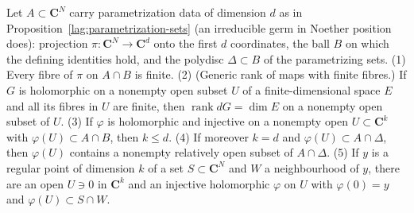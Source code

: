\begin{lemma}
\label{rem:finite-fibre-piece}
\leanok
Let \(A\subset\mathbf C^N\) carry parametrization data of dimension \(d\) as in Proposition~\ref{lag:parametrization-sets} (an irreducible germ in Noether position
does): projection \(\pi\colon\mathbf C^N\to\mathbf C^d\) onto the first \(d\) coordinates, the ball \(B\) on which the defining identities hold, and the polydisc
\(\Delta\subset B\) of the parametrizing sets.
(1) Every fibre of \(\pi\) on \(A\cap B\) is finite.
(2) (Generic rank of maps with finite fibres.) If \(G\) is holomorphic on a nonempty open subset \(U\) of a finite-dimensional space \(E\) and all its fibres in \(U\) are
finite, then \(\operatorname{rank}dG=\dim E\) on a nonempty open subset of \(U\).
(3) If \(\varphi\) is holomorphic and injective on a nonempty open \(U\subset\mathbf C^k\) with \(\varphi(U)\subset A\cap B\), then \(k\le d\).
(4) If moreover \(k=d\) and \(\varphi(U)\subset A\cap\Delta\), then \(\varphi(U)\) contains a nonempty relatively open subset of \(A\cap\Delta\).
(5) If \(y\) is a regular point of dimension \(k\) of a set \(S\subset\mathbf C^N\) and \(W\) a neighbourhood of \(y\), there are an open \(U\ni0\) in \(\mathbf C^k\) and an injective
holomorphic \(\varphi\) on \(U\) with \(\varphi(0)=y\) and \(\varphi(U)\subset S\cap W\).
\end{lemma}
